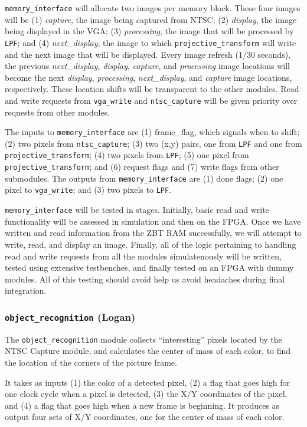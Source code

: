 \documentclass[10pt]{article}
\begin{document}
{\tt memory\_interface} will allocate two images per memory block. These four images will be (1) {\it capture}, the image being captured from NTSC; (2) {\it display}, the image being displayed in the VGA; (3) {\it processing}, the image that will be processed by {\tt LPF}; and (4) {\it next\_display}, the image to which {\tt projective\_transform} will write and the next image that will be displayed. Every image refresh (1/30 seconds), the previous {\it next\_display}, {\it display}, {\it capture}, and {\it processing} image locations will become the next {\it display}, {\it processing}, {\it next\_display}, and {\it capture} image locations, respectively. These location shifts will be transparent to the other modules. Read and write requests from {\tt vga\_write} and {\tt ntsc\_capture} will be given priority over requests from other modules.

The inputs to {\tt memory\_interface} are (1) frame\_flag, which signals when to shift; (2) two pixels from {\tt ntsc\_capture}; (3) two (x,y) pairs, one from {\tt LPF} and one from {\tt projective\_transform}; (4) two pixels from {\tt LPF}; (5) one pixel from {\tt projective\_transform}; and (6) request flags and (7) write flags from other submodules. The outputs from {\tt memory\_interface} are (1) done flags; (2) one pixel to {\tt vga\_write}; and (3) two pixels to {\tt LPF}.

{\tt memory\_interface} will be tested in stages. Initially, basic read and write functionality will be assessed in simulation and then on the FPGA. Once we have written and read information from the ZBT RAM successfully, we will attempt to write, read, and display an image. Finally, all of the logic pertaining to handling read and write requests from all the modules simulatenously will be written, tested using extensive testbenches, and finally tested on an FPGA with dummy modules. All of this testing should avoid help us avoid headaches during final integration.

\subsubsection{{\tt object\_recognition} (Logan)}
The {\tt object\_recognition} module collects ``interesting'' pixels located by the NTSC Capture module, and calculates the center of mass of each color, to find the location of the corners of the picture frame.

It takes as inputs (1) the color of a detected pixel, (2) a flag that goes high for one clock cycle when a pixel is detected, (3) the X/Y coordinates of the pixel, and (4) a flag that goes high when a new frame is beginning. It produces as output four sets of X/Y coordinates, one for the center of mass of each color.
\end{document}
